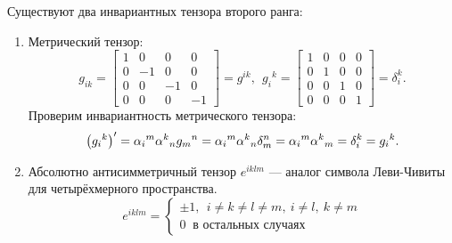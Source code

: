     Существуют два инвариантных тензора второго ранга:
    \begin{enumerate}
        \item Метрический тензор:
            \[
                g_{ik} = \begin{bmatrix}
                    1 & 0 & 0 & 0  \\
                    0 & -1 & 0 & 0\\
                    0 & 0 & -1 & 0 \\
                    0 & 0 & 0 & -1
                \end{bmatrix} = g^{ik}, \:\:
                {g_i}^k = \begin{bmatrix}
                    1 & 0 & 0 & 0  \\
                    0 & 1 & 0 & 0  \\
                    0 & 0 & 1 & 0  \\
                    0 & 0 & 0 & 1 
                \end{bmatrix} = \delta_i^k.
            \]
            Проверим инвариантность метрического тензора:
            \[
                \left({{g_i}^k}\right)' = {\alpha_i}^m{\alpha^k}_n {g_m}^n = {\alpha_i}^m{\alpha^k}_n\delta_m^n =
                {\alpha_i}^m{\alpha^k}_m = \delta_i^k = {g_i}^k.
            \]
        \item Абсолютно антисимметричный тензор $e^{iklm}$ --- аналог символа Леви-Чивиты для четырёхмерного пространства.
            \[
                e^{iklm} = \begin{cases}
                    \pm 1, \:\: i \not= k \not= l \not=m, \: i \not= l, \: k \not= m \\
                    0 \: \textrm{ в остальных случаях}
                \end{cases}
            \]
            

\end{enumerate}
